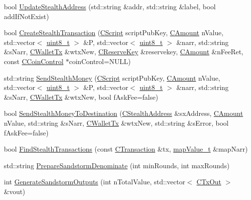 \begin{DoxyCompactItemize}
\item 
bool \hyperlink{class_c_wallet_ae7ab98f84a9f05da46ca943b8f305c85}{Update\+Stealth\+Address} (std\+::string \&addr, std\+::string \&label, bool add\+If\+Not\+Exist)
\item 
bool \hyperlink{class_c_wallet_ac797b6473e72f0569afcf3f7445d9965}{Create\+Stealth\+Transaction} (\hyperlink{class_c_script}{C\+Script} script\+Pub\+Key, \hyperlink{amount_8h_a4eaf3a5239714d8c45b851527f7cb564}{C\+Amount} n\+Value, std\+::vector$<$ \hyperlink{stdint_8h_aba7bc1797add20fe3efdf37ced1182c5}{uint8\+\_\+t} $>$ \&P, std\+::vector$<$ \hyperlink{stdint_8h_aba7bc1797add20fe3efdf37ced1182c5}{uint8\+\_\+t} $>$ \&narr, std\+::string \&s\+Narr, \hyperlink{class_c_wallet_tx}{C\+Wallet\+Tx} \&wtx\+New, \hyperlink{class_c_reserve_key}{C\+Reserve\+Key} \&reservekey, \hyperlink{amount_8h_a4eaf3a5239714d8c45b851527f7cb564}{C\+Amount} \&n\+Fee\+Ret, const \hyperlink{class_c_coin_control}{C\+Coin\+Control} $\ast$coin\+Control=N\+U\+L\+L)
\item 
std\+::string \hyperlink{class_c_wallet_a509492fe45395af29a4a16045686c239}{Send\+Stealth\+Money} (\hyperlink{class_c_script}{C\+Script} script\+Pub\+Key, \hyperlink{amount_8h_a4eaf3a5239714d8c45b851527f7cb564}{C\+Amount} n\+Value, std\+::vector$<$ \hyperlink{stdint_8h_aba7bc1797add20fe3efdf37ced1182c5}{uint8\+\_\+t} $>$ \&P, std\+::vector$<$ \hyperlink{stdint_8h_aba7bc1797add20fe3efdf37ced1182c5}{uint8\+\_\+t} $>$ \&narr, std\+::string \&s\+Narr, \hyperlink{class_c_wallet_tx}{C\+Wallet\+Tx} \&wtx\+New, bool f\+Ask\+Fee=false)
\item 
bool \hyperlink{class_c_wallet_afce932bf3aa678046ab75eccff004858}{Send\+Stealth\+Money\+To\+Destination} (\hyperlink{class_c_stealth_address}{C\+Stealth\+Address} \&sx\+Address, \hyperlink{amount_8h_a4eaf3a5239714d8c45b851527f7cb564}{C\+Amount} n\+Value, std\+::string \&s\+Narr, \hyperlink{class_c_wallet_tx}{C\+Wallet\+Tx} \&wtx\+New, std\+::string \&s\+Error, bool f\+Ask\+Fee=false)
\item 
bool \hyperlink{class_c_wallet_a5d0e2025dc7a87a0406be272b80509ee}{Find\+Stealth\+Transactions} (const \hyperlink{class_c_transaction}{C\+Transaction} \&tx, \hyperlink{wallet_8h_ab1e69952accb0e7c635e4d7f2b19802b}{map\+Value\+\_\+t} \&map\+Narr)
\item 
std\+::string \hyperlink{class_c_wallet_a3106747387ad6e066a9c44fd6db22a0d}{Prepare\+Sandstorm\+Denominate} (int min\+Rounds, int max\+Rounds)
\item 
int \hyperlink{class_c_wallet_a5d16c98ff8927189cb7393713edebd51}{Generate\+Sandstorm\+Outputs} (int n\+Total\+Value, std\+::vector$<$ \hyperlink{class_c_tx_out}{C\+Tx\+Out} $>$ \&vout)

\end{DoxyCompactItemize}
